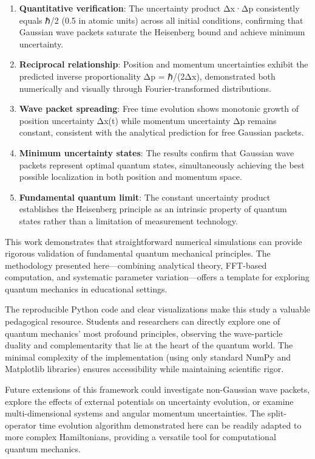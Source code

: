 \documentclass[
  11pt,
]{article}
\begin{document}
\begin{enumerate}
\def\labelenumi{\arabic{enumi}.}
\item
  \textbf{Quantitative verification}: The uncertainty product Δx·Δp
  consistently equals ℏ/2 (0.5 in atomic units) across all initial
  conditions, confirming that Gaussian wave packets saturate the
  Heisenberg bound and achieve minimum uncertainty.
\item
  \textbf{Reciprocal relationship}: Position and momentum uncertainties
  exhibit the predicted inverse proportionality Δp = ℏ/(2Δx),
  demonstrated both numerically and visually through Fourier-transformed
  distributions.
\item
  \textbf{Wave packet spreading}: Free time evolution shows monotonic
  growth of position uncertainty Δx(t) while momentum uncertainty Δp
  remains constant, consistent with the analytical prediction for free
  Gaussian packets.
\item
  \textbf{Minimum uncertainty states}: The results confirm that Gaussian
  wave packets represent optimal quantum states, simultaneously
  achieving the best possible localization in both position and momentum
  space.
\item
  \textbf{Fundamental quantum limit}: The constant uncertainty product
  establishes the Heisenberg principle as an intrinsic property of
  quantum states rather than a limitation of measurement technology.
\end{enumerate}

This work demonstrates that straightforward numerical simulations can
provide rigorous validation of fundamental quantum mechanical
principles. The methodology presented here---combining analytical
theory, FFT-based computation, and systematic parameter
variation---offers a template for exploring quantum mechanics in
educational settings.

The reproducible Python code and clear visualizations make this study a
valuable pedagogical resource. Students and researchers can directly
explore one of quantum mechanics' most profound principles, observing
the wave-particle duality and complementarity that lie at the heart of
the quantum world. The minimal complexity of the implementation (using
only standard NumPy and Matplotlib libraries) ensures accessibility
while maintaining scientific rigor.

Future extensions of this framework could investigate non-Gaussian wave
packets, explore the effects of external potentials on uncertainty
evolution, or examine multi-dimensional systems and angular momentum
uncertainties. The split-operator time evolution algorithm demonstrated
here can be readily adapted to more complex Hamiltonians, providing a
versatile tool for computational quantum mechanics.
\end{document}
